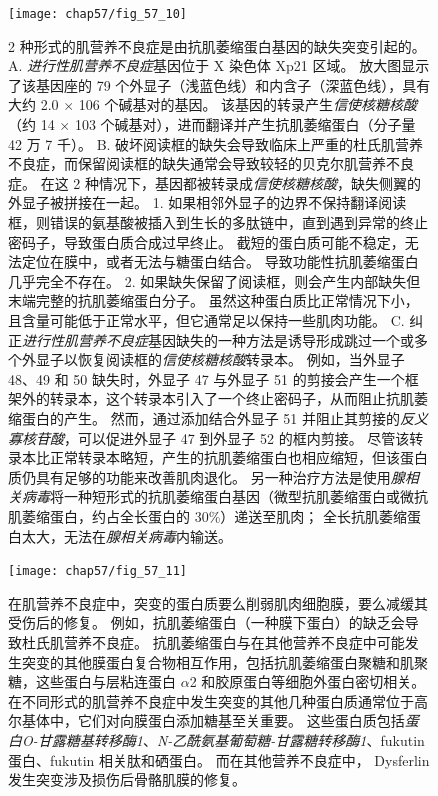 \begin{figure}[htbp]
	\centering
	\texttt{[image: chap57/fig\_57\_10]}
	\caption{2 种形式的肌营养不良症是由抗肌萎缩蛋白基因的缺失突变引起的\cite{hoffman1987dystrophin}。
		A. \textit{进行性肌营养不良症}基因位于 X 染色体 Xp21 区域。
		放大图显示了该基因座的 79 个外显子（浅蓝色线）和内含子（深蓝色线），具有大约 2.0 $\times$ 106 个碱基对的基因。
		该基因的转录产生\textit{信使核糖核酸}（约 14 $\times$ 103 个碱基对），进而翻译并产生抗肌萎缩蛋白（分子量 42 万 7 千）。
		B. 破坏阅读框的缺失会导致临床上严重的杜氏肌营养不良症，而保留阅读框的缺失通常会导致较轻的贝克尔肌营养不良症。
		在这 2 种情况下，基因都被转录成\textit{信使核糖核酸}，缺失侧翼的外显子被拼接在一起。
		1. 如果相邻外显子的边界不保持翻译阅读框，则错误的氨基酸被插入到生长的多肽链中，直到遇到异常的终止密码子，导致蛋白质合成过早终止。
		截短的蛋白质可能不稳定，无法定位在膜中，或者无法与糖蛋白结合。
		导致功能性抗肌萎缩蛋白几乎完全不存在。
		2. 如果缺失保留了阅读框，则会产生内部缺失但末端完整的抗肌萎缩蛋白分子。
		虽然这种蛋白质比正常情况下小，且含量可能低于正常水平，但它通常足以保持一些肌肉功能。
		C. 纠正\textit{进行性肌营养不良症}基因缺失的一种方法是诱导形成跳过一个或多个外显子以恢复阅读框的\textit{信使核糖核酸}转录本。
		例如，当外显子 48、49 和 50 缺失时，外显子 47 与外显子 51 的剪接会产生一个框架外的转录本，这个转录本引入了一个终止密码子，从而阻止抗肌萎缩蛋白的产生。
		然而，通过添加结合外显子 51 并阻止其剪接的\textit{反义寡核苷酸}，可以促进外显子 47 到外显子 52 的框内剪接。
		尽管该转录本比正常转录本略短，产生的抗肌萎缩蛋白也相应缩短，但该蛋白质仍具有足够的功能来改善肌肉退化。
		另一种治疗方法是使用\textit{腺相关病毒}将一种短形式的抗肌萎缩蛋白基因（微型抗肌萎缩蛋白或微抗肌萎缩蛋白，约占全长蛋白的 30\%）递送至肌肉；
		全长抗肌萎缩蛋白太大，无法在\textit{腺相关病毒}内输送。}
	\label{fig:57_10}
\end{figure}


\begin{figure}[htbp]
	\centering
	\texttt{[image: chap57/fig\_57\_11]}
	\caption{在肌营养不良症中，突变的蛋白质要么削弱肌肉细胞膜，要么减缓其受伤后的修复。
		例如，抗肌萎缩蛋白（一种膜下蛋白）的缺乏会导致杜氏肌营养不良症。
		抗肌萎缩蛋白与在其他营养不良症中可能发生突变的其他膜蛋白复合物相互作用，包括抗肌萎缩蛋白聚糖和肌聚糖，这些蛋白与层粘连蛋白 $\alpha$2 和胶原蛋白等细胞外蛋白密切相关。
		在不同形式的肌营养不良症中发生突变的其他几种蛋白质通常位于高尔基体中，它们对向膜蛋白添加糖基至关重要。
		这些蛋白质包括\textit{蛋白O-甘露糖基转移酶1}、\textit{N-乙酰氨基葡萄糖-甘露糖转移酶1}、fukutin蛋白、fukutin 相关肽和硒蛋白。
		而在其他营养不良症中， Dysferlin发生突变涉及损伤后骨骼肌膜的修复\cite{brown2005harrison}。}
	\label{fig:57_11}
\end{figure}


